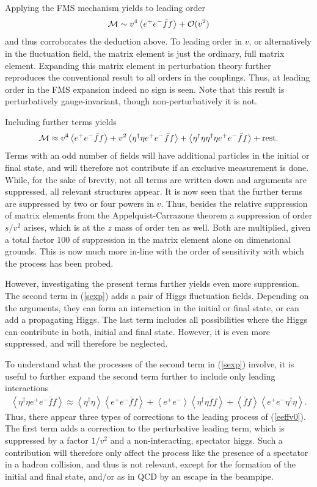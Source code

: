 \documentclass[final,12pt,3p,longtitle]{elsarticle}
\newcommand*{\no}{\noindent}
\newcommand*{\bea}{\begin{eqnarray}}
\newcommand*{\eea}{\end{eqnarray}}
\newcommand*{\be}{\begin{equation}}
\newcommand*{\ee}{\end{equation}}
\newcommand*{\pref}[1]{(\ref{#1})}
\newcommand*{\1}{1\!\!\!\bot}
\newcommand*{\la}{\left\langle}
\newcommand*{\ra}{\right\rangle}
\newcommand*{\op}{{\cal O}}
\begin{document}
Applying the FMS mechanism yields to leading order
\be
{\cal M}\sim v^4\la e^+e^-\bar{f}f\ra+\op(v^2)\label{eeffv0}
\ee
\no and thus corroborates the deduction above. To leading order in $v$, or alternatively in the fluctuation field, the matrix element is just the ordinary, full matrix element. Expanding this matrix element in perturbation theory further reproduces the conventional result \cite{Bohm:2001yx} to all orders in the couplings. Thus, at leading order in the FMS expansion indeed no sign is seen. Note that this result is perturbatively gauge-invariant, though non-perturbatively it is not.

Including further terms yields \cite{Egger:2017tkd}
\be
{\cal M}\approx v^4\la e^+e^-\bar{f}f\ra+v^2\la\eta^\dagger\eta e^+e^-\bar{f}f\ra+\la\eta^\dagger\eta\eta^\dagger\eta e^+e^-\bar{f}f\ra + \text{rest}\label{sexp}.
\ee
\no Terms with an odd number of fields will have additional particles in the initial or final state, and will therefore not contribute if an exclusive measurement is done. While, for the sake of brevity, not all terms are written down and arguments are suppressed, all relevant structures appear. It is now seen that the further terms are suppressed by two or four powers in $v$. Thus, besides the relative suppression of matrix elements from the Appelquist-Carrazone theorem a suppression of order $s/v^2$ arises, which is at the $z$ mass of order ten as well. Both are multiplied, given a total factor 100 of suppression in the matrix element alone on dimensional grounds. This is now much more in-line with the order of sensitivity with which the process has been probed.

However, investigating the present terms further yields even more suppression. The second term in \pref{sexp} adds a pair of Higgs fluctuation fields. Depending on the arguments, they can form an interaction in the initial or final state, or can add a propagating Higgs. The last term includes all possibilities where the Higgs can contribute in both, initial and final state. However, it is even more suppressed, and will therefore be neglected.

To understand what the processes of the second term in \pref{sexp} involve, it is useful to further expand the second term further to include only leading interactions \cite{Egger:2017tkd}
\bea
\la\eta^\dagger\eta e^+e^-\bar{f}f\ra\approx\la\eta^\dagger\eta\ra\la e^+e^-\bar{f}f\ra  +  \la e^+e^-\ra\la\eta^\dagger\eta\bar{f}f\ra+  \la\bar{f}f\ra\la e^+e^-\eta^\dagger\eta\ra\label{sexp2}.
\eea
\no Thus, there appear three types of corrections to the leading process of \pref{eeffv0}. The first term adds a correction to the perturbative leading term, which is suppressed by a factor $1/v^2$ and a non-interacting, spectator higgs. Such a contribution will therefore only affect the process like the presence of a spectator in a hadron collision, and thus is not relevant, except for the formation of the initial and final state, and/or as in QCD by an escape in the beampipe.
\end{document}
